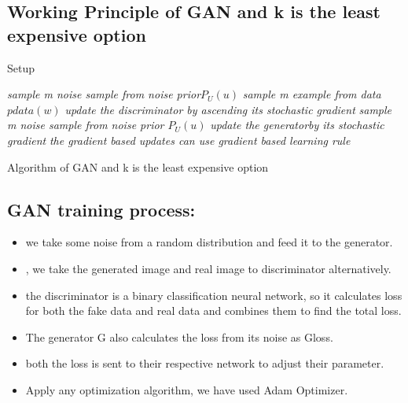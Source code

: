\documentclass[runningheads]{llncs}
\begin{document}
\subsection{Working Principle of GAN and k is the least expensive option}
\begin{algorithm*}[H]
\caption{Setup}
\label{algo:pre}
\begin{algorithmic}[1]
    
            \STATE \emph{sample m noise sample from noise prior{$P_U(u)$}}
            \STATE \emph{sample m example from data  {$pdata(w)$}}
            \STATE \emph{update the discriminator by ascending its stochastic gradient}
        \ENDFOR
        \STATE \emph{sample m noise sample from noise prior ${P_U(u)}$}
        \STATE \emph{update the generatorby its stochastic gradient}
    \ENDFOR
    \STATE \emph{the gradient based updates can use gradient based learning rule}

 \caption{Algorithm of GAN and k is the least expensive option}    
\end{algorithmic}
\end{algorithm*}

\subsection{\textbf{GAN training process:}}
\newline
\begin{itemize}
  \item we take some noise from a random distribution and feed it to the generator. 
  \item, we take the generated image and real image to discriminator alternatively.
  \item the discriminator is a binary classification neural network, so it calculates loss for both the fake data and real data and combines them to find the total loss.
  \item The generator G also calculates the loss from its noise as Gloss.
  \item both the loss is sent to their respective network to adjust their parameter.
  \item Apply any optimization algorithm, we have used Adam Optimizer.
\end{itemize}
\newline
\end{document}
